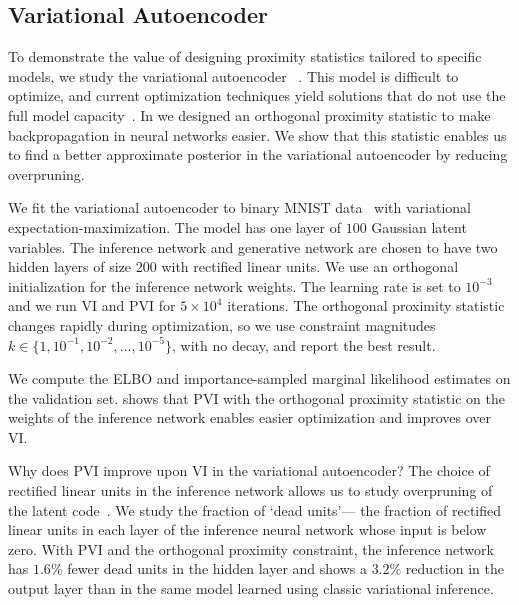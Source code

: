 
\subsection{Variational Autoencoder}
\label{sec:variational_autoencoder}
To demonstrate the value of designing proximity statistics tailored to specific   models,  we study the variational autoencoder~ \citep{kingma2014autoencoding,rezende2014stochastic}. This model is difficult to optimize, and current optimization techniques yield solutions that do not use the full model capacity~\citep{Burda2016}. In  we designed an orthogonal proximity statistic to make backpropagation in neural networks easier. We show that this statistic enables us to find a better approximate posterior in the variational autoencoder by reducing overpruning.

We fit the variational autoencoder to binary MNIST data~\citep{pmlr-v15-larochelle11a} with variational expectation-maximization. The model has one layer of $100$ Gaussian latent variables. The inference network and generative network are chosen to have two hidden layers of size $200$ with rectified linear units. We use an orthogonal initialization for the inference network weights. The learning rate is set to $10^{-3}$ and we run \gls{VI} and \gls{PVI} for $5\times 10^4$ iterations. The orthogonal proximity statistic changes rapidly during optimization, so we use constraint magnitudes $k \in \{1, 10^{-1}, 10^{-2}, ..., 10^{-5}\}$, with no decay, and report the best result.

We compute the \gls{ELBO} and importance-sampled marginal likelihood estimates on the validation set.  shows that \gls{PVI} with the orthogonal proximity statistic on the weights of the inference network enables easier optimization and improves over \gls{VI}.

Why does \gls{PVI} improve upon \gls{VI} in the variational autoencoder? The choice of rectified linear units in the inference network allows us to  study overpruning of the latent code~\citep{mackay2001,Burda2016}. We study  the fraction of `dead units'--- the fraction of rectified linear units in each layer of the inference   neural network whose input is below zero. With \gls{PVI}  and the orthogonal proximity constraint, the inference network has $1.6\%$ fewer dead units in the hidden layer and shows a $3.2\%$ reduction in the output layer than in the same model learned using classic variational inference.

